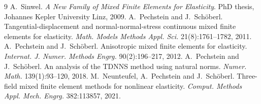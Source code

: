 \documentclass[10pt,a4paper]{article}
\begin{document}
{\footnotesize\setlength{\itemsep}{0pt}
\begin{thebibliography}{9}\setlength{\itemsep}{1pt}
 A.~Sinwel. \emph{A New Family of Mixed Finite Elements for Elasticity}. PhD thesis, Johannes Kepler University Linz, 2009.
 A.~Pechstein and J.~Sch\"oberl. Tangential-displacement and normal-normal-stress continuous mixed finite elements for elasticity. \emph{Math. Models Methods Appl. Sci.} 21(8):1761--1782, 2011.
 A.~Pechstein and J.~Sch\"oberl. Anisotropic mixed finite elements for elasticity. \emph{Internat. J. Numer. Methods Engrg.} 90(2):196--217, 2012.
 A.~Pechstein and J.~Sch\"oberl. An analysis of the TDNNS method using natural norms. \emph{Numer. Math.} 139(1):93--120, 2018.
 M.~Neunteufel, A.~Pechstein and J.~Sch\"oberl. Three-field mixed finite element methods for nonlinear elasticity. \emph{Comput. Methods Appl. Mech. Engrg.} 382:113857, 2021.
\end{thebibliography}}
\end{document}
